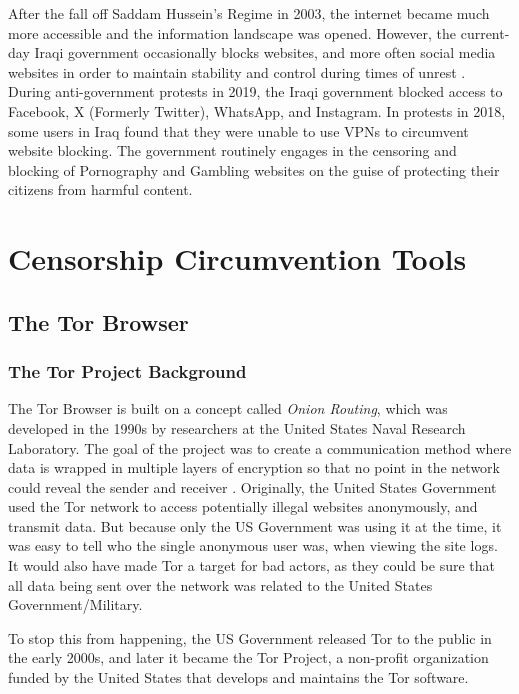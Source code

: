 After the fall off Saddam Hussein's Regime in 2003, the internet became much more accessible and the information landscape was opened. However, the current-day Iraqi government occasionally blocks websites, and more often social media websites in order to maintain stability and control during times of unrest \cite{freedomhouseIraqFreedom}. During anti-government protests in 2019, the Iraqi government blocked access to Facebook, X (Formerly Twitter), WhatsApp, and Instagram. In protests in 2018, some users in Iraq found that they were unable to use VPNs to circumvent website blocking. The government routinely engages in the censoring and blocking of Pornography and Gambling websites on the guise of protecting their citizens from harmful content. 

\section{Censorship Circumvention Tools}

\subsection{The Tor Browser}

\subsubsection{The Tor Project Background}

The Tor Browser is built on a concept called \textit{Onion Routing}, which was developed in the 1990s by researchers at the United States Naval Research Laboratory. The goal of the project was to create a communication method where data is wrapped in multiple layers of encryption so that no point in the network could reveal the sender and receiver \cite{torprojectProjectPrivacy}. Originally, the United States Government used the Tor network to access potentially illegal websites anonymously, and transmit data. But because only the US Government was using it at the time, it was easy to tell who the single anonymous user was, when viewing the site logs. It would also have made Tor a target for bad actors, as they could be sure that all data being sent over the network was related to the United States Government/Military.

To stop this from happening, the US Government released Tor to the public in the early 2000s, and later it became the Tor Project, a non-profit organization funded by the United States that develops and maintains the Tor software. 

